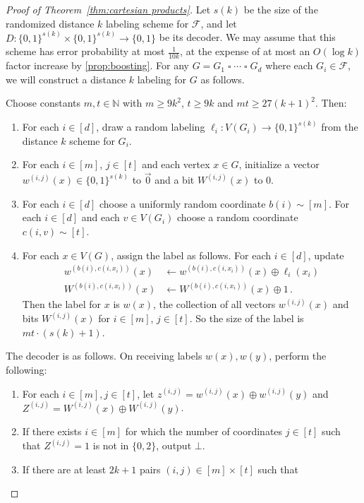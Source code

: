 \documentclass{theoretics}
\newcommand{\zo}{\{0,1\}}
\newcommand{\cF}{\ensuremath{\mathcal{F}}}
\newcommand{\bN}{\ensuremath{\mathbb{N}}}
\begin{document}
\begin{proof}[Proof of Theorem~\ref{thm:cartesian products}]
Let $s(k)$ be the size of the randomized distance $k$ labeling scheme for $\cF$, and let $D :
\zo^{s(k)} \times \zo^{s(k)} \to \zo$ be its decoder. We may assume that this scheme has error
probability at most $\frac1{10k}$, at the expense of at most an $O(\log k)$ factor increase by
\cref{prop:boosting}. For any $G = G_1 \mathbin\square \dotsm \mathbin\square G_d$ where each $G_i \in \cF$, we will
construct a distance $k$ labeling for $G$ as follows.

Choose constants $m,t\in\bN$ with $m \geq 9k^2$, $t \geq 9k$ and $mt\ge 27(k+1)^2$. Then:
\begin{enumerate}
\item For each $i \in [d]$, draw a random labeling $\ell_i : V(G_i) \to \zo^{s(k)}$ from the
distance $k$ scheme for $G_i$.
\item  For each $i \in [m]$, $j \in [t]$ and each vertex $x \in
G$, initialize a vector $w^{(i,j)}(x) \in \zo^{s(k)}$ to $\vec 0$ and a bit $W^{(i,j)}(x)$ to 0.
\item For each $i \in [d]$ choose a uniformly random coordinate $b(i) \sim [m]$. For each $i \in
[d]$ and each $v \in V(G_i)$ choose a random coordinate $c(i,v) \sim [t]$.
\item For each $x \in V(G)$, assign the label as follows. For each $i \in [d]$, update
\begin{align*}
  w^{(b(i), c(i,x_i))}(x) &\gets w^{(b(i), c(i,x_i))}(x) \oplus \ell_i(x_i) \\
  W^{(b(i), c(i,x_i))}(x) &\gets W^{(b(i), c(i,x_i))}(x) \oplus 1 \,.
\end{align*}
Then the label for $x$ is $w(x)$, the collection of all vectors $w^{(i,j)}(x)$ and bits $W^{(i,j)}(x)$ 
for $i \in [m]$, $j \in [t]$.  
So the size of the label is $mt \cdot (s(k)+1)$.
\end{enumerate}
The decoder is as follows. On receiving labels $w(x),w(y)$, perform the following:
\begin{enumerate}
\item For each $i \in [m], j \in [t]$, let $z^{(i,j)} = w^{(i,j)}(x) \oplus w^{(i,j)}(y)$ and
$Z^{(i,j)} = W^{(i,j)}(x) \oplus W^{(i,j)}(y)$.
\item If there exists $i \in [m]$ for which the number of coordinates $j \in [t]$ such that
$Z^{(i,j)} = 1$ is not in $\{0,2\}$, output $\bot$.
\item If there are at least $2k+1$ pairs $(i,j) \in [m] \times [t]$ such that

\end{enumerate}
\end{proof}
\end{document}
